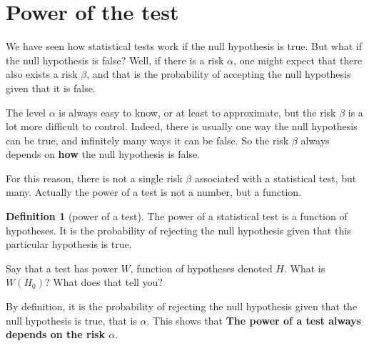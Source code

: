 \documentclass[a4paper]{article}
\theoremstyle{definition}
\newtheorem{definition}{Definition}
\begin{document}
\section{Power of the test}

We have seen how statistical tests work if the null hypothesis is true.
But what if the null hypothesis is false? Well, if there is a risk
$\alpha$, one might expect that there also exists a risk $\beta$, and
that is the probability of accepting the null hypothesis given that
it is false.

The level $\alpha$ is always easy to know, or at least to approximate,
but the risk $\beta$ is a lot more difficult to control. Indeed,
there is usually one way the null hypothesis can be true, and infinitely
many ways it can be false. So the risk $\beta$ always depends on
\textbf{how} the null hypothesis is false.

For this reason, there is not a single risk $\beta$ associated with a
statistical test, but many. Actually the power of a test is not a
number, but a function.

\begin{definition}[power of a test]
The power of a statistical test is a function of hypotheses. It is
the probability of rejecting the null hypothesis given that this
particular hypothesis is true.
\end{definition}

\begin{Exercise}
Say that a test has power $W$, function of hypotheses denoted $H$.
What is $W(H_0)$? What does that tell you?
\end{Exercise}
\begin{Answer}
By definition, it is the probability of rejecting the null hypothesis
given that the null hypothesis is true, that is $\alpha$. This shows
that \textbf{The power of a test always depends on the risk $\alpha$}.
\end{Answer}
\end{document}

